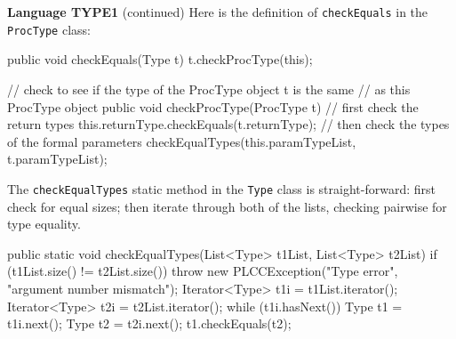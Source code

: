 \begin{minipage}[t]{\sw}
\slidenumber
\LARGE
{\bf Language TYPE1} (continued)\exx
\Large
Here is the definition of \verb'checkEquals' in the \verb'ProcType' class:
\large
\begin{qv}
public void checkEquals(Type t) {
    t.checkProcType(this);
}

// check to see if the type of the ProcType object t is the same
// as this ProcType object
public void checkProcType(ProcType t) {
    // first check the return types
    this.returnType.checkEquals(t.returnType);
    // then check the types of the formal parameters
    checkEqualTypes(this.paramTypeList, t.paramTypeList);
}
\end{qv}
\Large
The \verb'checkEqualTypes' static method
in the \verb'Type' class is straight-forward:
first check for equal sizes;
then iterate through both of the lists,
checking pairwise for type equality.
\large
\begin{qv}
public static void checkEqualTypes(List<Type> t1List, List<Type> t2List) {
    if (t1List.size() != t2List.size())
        throw new PLCCException("Type error", "argument number mismatch");
    Iterator<Type> t1i = t1List.iterator();
    Iterator<Type> t2i = t2List.iterator();
    while (t1i.hasNext()) {
        Type t1 = t1i.next();
        Type t2 = t2i.next();
        t1.checkEquals(t2);
    }
}
\end{qv}
\end{minipage}
